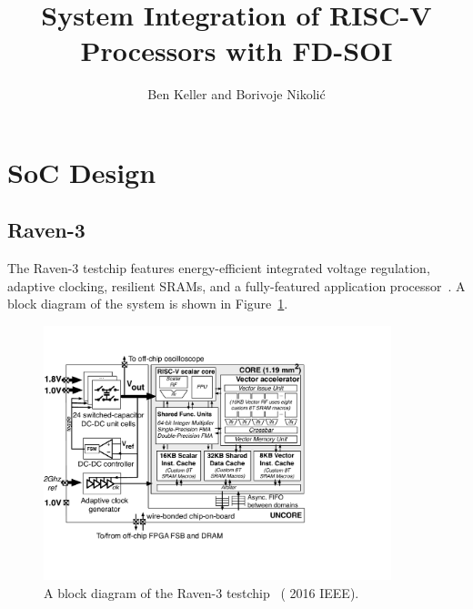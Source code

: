 \documentclass[graybox]{svmult}
\begin{document}
\title{System Integration of RISC-V Processors with FD-SOI}
\author{Ben Keller and Borivoje Nikoli\'{c}}
%
%
\maketitle




\section{SoC Design}

\subsection{Raven-3}

The Raven-3 testchip features energy-efficient integrated voltage regulation, adaptive clocking, resilient SRAMs, and a fully-featured application processor~\cite{Zimmer2016}.
A block diagram of the system is shown in Figure~\ref{fig:6-raven3-blockdiagram}.

\begin{figure}
  \centering
  \includegraphics[width=0.9\textwidth]{6-raven3-blockdiagram}
  \caption{A block diagram of the Raven-3 testchip~\cite{Zimmer2016} ({\textcopyright} 2016 IEEE).}
  \label{fig:6-raven3-blockdiagram}
\end{figure}
\end{document}
